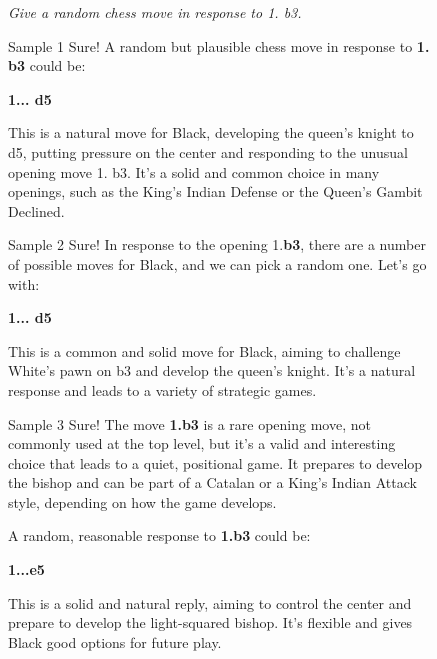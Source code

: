 \label{appx:generation-example-chess}

\begin{figure}[t]
\centering

\begin{promptbox}
\textit{Give a random chess move in response to 1. b3.}
\end{promptbox}

\begin{minipage}[t]{0.32\linewidth}
\begin{respbox}{Sample 1}
Sure! A random but plausible chess move in response to \textbf{1. b3} could be:

\textbf{1... d5}

This is a natural move for Black, developing the queen's knight to d5, putting pressure on the center and responding to the unusual opening move 1. b3. It's a solid and common choice in many openings, such as the King's Indian Defense or the Queen's Gambit Declined.
\end{respbox}
\end{minipage}\hfill%
\begin{minipage}[t]{0.32\linewidth}
\begin{respbox}{Sample 2}
Sure! In response to the opening 1.\textbf{b3}, there are a number of possible moves for Black, and we can pick a random one. Let's go with:

\textbf{1... d5}

This is a common and solid move for Black, aiming to challenge White's pawn on b3 and develop the queen's knight. It's a natural response and leads to a variety of strategic games.
\end{respbox}
\end{minipage}\hfill%
\begin{minipage}[t]{0.32\linewidth}
\begin{respbox}{Sample 3}
Sure! The move \textbf{1.b3} is a rare opening move, not commonly used at the top level, but it's a valid and interesting choice that leads to a quiet, positional game. It prepares to develop the bishop and can be part of a Catalan or a King's Indian Attack style, depending on how the game develops.

A random, reasonable response to \textbf{1.b3} could be:

\textbf{1...e5}

This is a solid and natural reply, aiming to control the center and prepare to develop the light-squared bishop. It's flexible and gives Black good options for future play.


\end{respbox}
\end{minipage}
\end{figure}
